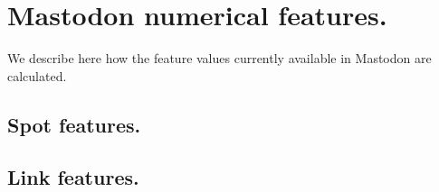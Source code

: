 \section{Mastodon numerical features.}
\label{FeaturesExplanation}

We describe here how the feature values currently available in Mastodon are calculated. 

\subsection{Spot features.}

\subsection{Link features.}